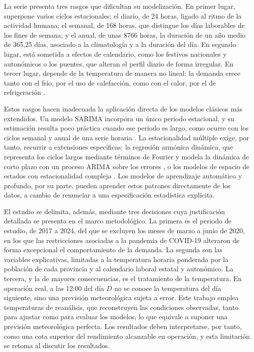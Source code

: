 La serie presenta tres rasgos que dificultan su modelización. En primer
lugar, superpone varios ciclos estacionales: el diario, de 24 horas, ligado
al ritmo de la actividad humana; el semanal, de 168 horas, que distingue los
días laborables de los fines de semana; y el anual, de unas 8766 horas, la
duración de un año medio de 365,25 días,
asociado a la climatología y a la duración del día. En segundo lugar, está
sometida a efectos de calendario, como los festivos nacionales y autonómicos
o los puentes, que alteran el perfil diario de forma irregular. En tercer
lugar, depende de la temperatura de manera no lineal: la demanda crece tanto
con el frío, por el uso de calefacción, como con el calor, por el de
refrigeración \parencite{hong2016probabilistic}.

Estos rasgos hacen inadecuada la aplicación directa de los modelos clásicos
más extendidos. Un modelo SARIMA incorpora un único periodo estacional, y su
estimación resulta poco práctica cuando ese periodo es largo, como ocurre con
los ciclos semanal y anual de una serie horaria
\parencite{hyndman2021fpp3}. La estacionalidad múltiple exige, por tanto,
recurrir a extensiones específicas: la regresión armónica dinámica, que
representa los ciclos largos mediante términos de Fourier y modela la
dinámica de corto plazo con un proceso ARIMA sobre los errores
\parencite{hyndman2021fpp3}, o los modelos de espacio de estados con
estacionalidad compleja \parencite{delivera2011forecasting}. Los modelos de
aprendizaje automático y profundo, por su parte, pueden aprender estos
patrones directamente de los datos, a cambio de renunciar a una
especificación estadística explícita.

El estudio se delimita, además, mediante tres decisiones cuya justificación
detallada se presenta en el marco metodológico. La primera es el periodo de
estudio, de 2017 a 2024, del que se excluyen los meses de marzo a junio de
2020, en los que las restricciones asociadas a la pandemia de COVID-19
alteraron de forma excepcional el comportamiento de la demanda. La segunda
son las variables explicativas, limitadas a la temperatura horaria ponderada
por la población de cada provincia y al calendario laboral estatal y
autonómico. La tercera, y la de mayores consecuencias, es el tratamiento de
la temperatura. En operación real, a las 12:00 del día $D$ no se conoce la
temperatura del día siguiente, sino una previsión meteorológica sujeta a
error. Este trabajo emplea temperaturas de reanálisis, que reconstruyen las
condiciones observadas, tanto para ajustar como para evaluar los modelos, lo que equivale a suponer
una previsión meteorológica perfecta. Los resultados deben interpretarse, por
tanto, como una cota superior del rendimiento alcanzable en operación, y esta
limitación se retoma al discutir los resultados.

